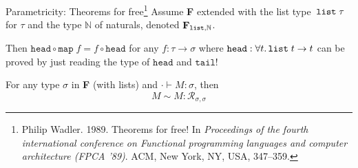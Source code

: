 \begin{frame}{Parametricity: Theorems for free\footnote{Philip Wadler. 1989. Theorems for free! In \emph{Proceedings of the fourth international conference on Functional programming languages and computer architecture (FPCA ’89)}. ACM, New York, NY, USA, 347–359.}}
  Assume \textbf{F} extended with the list type~$\mathtt{list}\;\tau$ for $\tau$ and
  the type $\mathbb{N}$ of naturals, denoted $\mathbf{F}_{\mathtt{list}, \mathbb{N}}$.

  Then $\mathtt{head} \circ \mathtt{map}\; f = f \circ \mathtt{head}$
      for any $f : \tau \to \sigma$ where $\mathtt{head} : \forall t.\, \mathtt{list}\;t \to t$
  can be proved by just reading the type of $\mathtt{head}$ and $\mathtt{tail}$!
  \begin{theorem}
    For any type $\sigma$ in \textbf{F} (with lists) and $\cdot  \vdash M : \sigma$, then 
    \[
      M \sim M : \mathcal{R}_{\sigma, \sigma}
    \]
  \end{theorem}
\end{frame}

%
%
%
%

